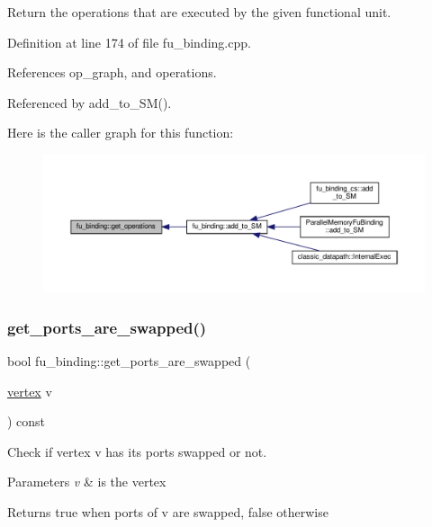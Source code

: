 Return the operations that are executed by the given functional unit. 



Definition at line 174 of file fu\+\_\+binding.\+cpp.



References op\+\_\+graph, and operations.



Referenced by add\+\_\+to\+\_\+\+S\+M().

Here is the caller graph for this function\+:
\nopagebreak
\begin{figure}[H]
\begin{center}
\leavevmode
\includegraphics[width=350pt]{d8/d04/classfu__binding_a478de19203821bdd6af592a06306a34e_icgraph}
\end{center}
\end{figure}
\mbox{\label{classfu__binding_a025a171ca9de5dbd653047a66cdae181}} 
\subsubsection{\texorpdfstring{get\+\_\+ports\+\_\+are\+\_\+swapped()}{get\_ports\_are\_swapped()}}
{\footnotesize\ttfamily bool fu\+\_\+binding\+::get\+\_\+ports\+\_\+are\+\_\+swapped (\begin{DoxyParamCaption}\item[{\hyperlink{graph_8hpp_abefdcf0544e601805af44eca032cca14}{vertex}}]{v }\end{DoxyParamCaption}) const\hspace{0.3cm}{\ttfamily [inline]}}



Check if vertex v has its ports swapped or not. 


\begin{DoxyParams}{Parameters}
{\em v} & is the vertex \\
\hline
\end{DoxyParams}
\begin{DoxyReturn}{Returns}
true when ports of v are swapped, false otherwise 
\end{DoxyReturn}


